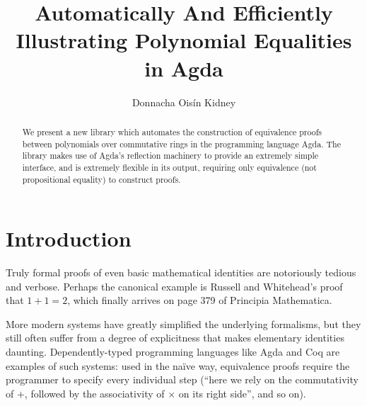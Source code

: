 \documentclass[draft, twocolumn]{article}
\author{Donnacha Oisín Kidney}
\title{Automatically And Efficiently Illustrating Polynomial Equalities in Agda}
\theoremstyle{definition}
\theoremstyle{remark}
\begin{document}
\maketitle
\begin{abstract}
  We present a new library which automates the construction of equivalence
  proofs between polynomials over commutative rings in the programming language
  Agda\cite{norell_dependently_2008}. The library makes use of Agda's reflection
  machinery to provide an extremely simple interface, and is extremely flexible
  in its output, requiring only equivalence (not propositional equality) to
  construct proofs.
\end{abstract}




  

  
\tableofcontents
\section{Introduction}
Truly formal proofs of even basic mathematical identities are notoriously
tedious and verbose. Perhaps the canonical example is Russell and Whitehead's
proof that \(1+1=2\), which finally arrives on page 379 of Principia
Mathematica\cite{whitehead_principia_1910}. 

More modern systems have greatly simplified the underlying formalisms, but they
still often suffer from a degree of explicitness that makes elementary
identities daunting. Dependently-typed programming languages like
Agda\cite{norell_dependently_2008} and
Coq\cite{the_coq_development_team_2018_1219885} are examples of such systems:
used in the naïve way, equivalence proofs require the programmer to specify
every individual step (``here we rely on the commutativity of \(+\), followed by
the associativity of \(\times\) on its right side'', and so on).
\end{document}
